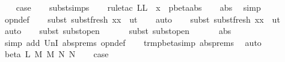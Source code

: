 \begin{isabellebody}
\ \ \isamarkupfalse%
\ {\isacharquery}case\isanewline
\ \ \isamarkupfalse%
\ subst{\isachardot}simps\isanewline
\ \ \isamarkupfalse%
\ {\isacharparenleft}rule{\isacharunderscore}tac\ L{\isacharequal}{\isachardoublequoteopen}L\ {\isasymunion}\ {\isacharbraceleft}x{\isacharbraceright}{\isachardoublequoteclose}\ \ pbeta{\isachardot}abs{\isacharparenright}\isanewline
\ \ \isamarkupfalse%
\ abs\ \isamarkupfalse%
\ simp\ \isanewline
\ \ \isamarkupfalse%
\ opn{\isacharprime}{\isacharunderscore}def\isanewline
\ \ \isamarkupfalse%
\ {\isacharparenleft}subst\ subst{\isacharunderscore}fresh{}{\isacharbrackleft}\ x{\isacharequal}x\ \ u{\isacharequal}t{\isacharbrackright}{\isacharparenright}\isanewline
\ \ \isamarkupfalse%
\ auto{\isacharbrackleft}{}{\isacharbrackright}\isanewline
\ \ \isamarkupfalse%
\ {\isacharparenleft}subst{\isacharparenleft}{}{\isacharparenright}\ subst{\isacharunderscore}fresh{}{\isacharbrackleft}\ x{\isacharequal}x\ \ u{\isacharequal}t{\isacharprime}{\isacharbrackright}{\isacharparenright}\isanewline
\ \ \isamarkupfalse%
\ auto{\isacharbrackleft}{}{\isacharbrackright}\isanewline
\ \ \isamarkupfalse%
\ {\isacharparenleft}subst\ subst{\isacharunderscore}open{}{\isacharparenright}\isanewline
\ \ \isamarkupfalse%
\isanewline
\ \ \isamarkupfalse%
\ {\isacharparenleft}subst\ subst{\isacharunderscore}open{}{\isacharparenright}\isanewline
\ \ \isamarkupfalse%
\isanewline
\ \ \isamarkupfalse%
\ abs{\isacharparenleft}{}{\isacharcomma}{}{\isacharparenright}\ \isamarkupfalse%
\ {\isacharparenleft}simp\ add{\isacharcolon}\ UnI{}\ abs{\isachardot}prems\ opn{\isacharprime}{\isacharunderscore}def{\isacharparenright}\isanewline
\ \ \isamarkupfalse%
\ trm{\isacharunderscore}pbeta{\isacharunderscore}simp{}\ abs{\isachardot}prems\ \isamarkupfalse%
\ auto\isanewline
\ \isamarkupfalse%
\isanewline
{}\isamarkupfalse%
\ {\isacharparenleft}beta\ L\ M\ M{\isacharprime}\ N\ N{\isacharprime}{\isacharparenright}\isanewline
\ \ \isamarkupfalse%
\ {\isacharquery}case\ \isamarkupfalse%

\end{isabellebody}
